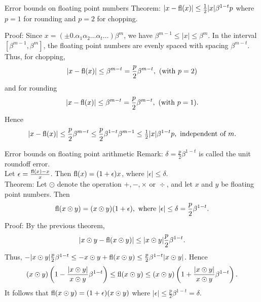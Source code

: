 \documentclass{beamer}
\begin{document}
\begin{frame}{Error bounds on floating point numbers}
Theorem: $|x - \text{fl}(x)| \leq \tfrac{1}{2} |x| \beta^{1-t} p$
where $p=1$ for rounding and $p=2$ for chopping.

Proof: Since $x = (\pm 0.\alpha_1 \alpha_2 \ldots \alpha_t \ldots) \beta^m$, we have
$\beta^{m-1} \leq |x| \leq \beta^m$. In the interval $[\beta^{m-1}, \beta^m]$, the floating point numbers
are evenly spaced with spacing $\beta^{m - t}$. Thus, for chopping,
\begin{equation*}
|x - \text{fl}(x)| \leq \beta^{m - t} = \frac{p}{2} \beta^{m-t}, \text{ (with $p = 2$)}
\end{equation*}
and for rounding
\begin{equation*}
|x - \text{fl}(x)| \leq \beta^{m - t} = \frac{p}{2} \beta^{m-t}, \text{ (with $p = 1$)}.
\end{equation*}
Hence
\begin{equation*}
|x - \text{fl}(x)| \leq \frac{p}{2} \beta^{m - t} \leq \frac{p}{2} \beta^{1-t} \beta^{m-1} \leq \tfrac{1}{2} |x| \beta^{1-t} p,\text{ independent of $m$}.
\end{equation*}
\end{frame}

\begin{frame}{Error bounds on floating point arithmetic}
Remark: $\delta = \frac{p}{2} \beta^{1-t}$ is called the unit roundoff error.\\
Let $\epsilon = \frac{\text{fl}(x) - x}{x}$. Then $\text{fl}(x) = (1 + \epsilon) x$, where $|\epsilon| \leq \delta$.\\
Theorem: Let $\odot$ denote the operation $+, -, \times \text{ or } \div$, and let $x$ and $y$ be
floating point numbers. Then
\begin{equation*}
\text{fl}(x \odot y) = (x \odot y)(1 + \epsilon), \text{ where } |\epsilon| \leq \delta = \frac{p}{2} \beta^{1-t}.
\end{equation*}
Proof: By the previous theorem,
\begin{equation*}
|x \odot y - \text{fl}(x \odot y)| \leq |x \odot y| \frac{p}{2} \beta^{1-t}.
\end{equation*}
Thus, $-|x \odot y| \frac{p}{2} \beta^{1 - t} \leq -x \odot y + \text{fl}(x \odot y) \leq \frac{p}{2} \beta^{1 - t} |x \odot y|$.
Hence
\begin{equation*}
(x \odot y)\left(1 - \frac{|x \odot y|}{x \odot y} \beta^{1-t} \right) \leq \text{fl}(x \odot y) \leq 
(x \odot y)\left(1 + \frac{|x \odot y|}{x \odot y} \beta^{1-t}\right).
\end{equation*}
It follows that $\text{fl}(x \odot y) = (1 + \epsilon) (x \odot y)$ where
$|\epsilon| \leq \frac{p}{2} \beta^{1-t} = \delta$.
\end{frame}
\end{document}

